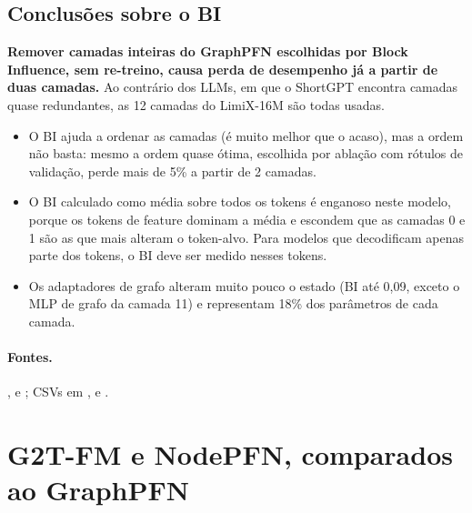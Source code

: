 \documentclass[12pt,a4paper]{article}
\begin{document}
\subsection{Conclusões sobre o BI}

\textbf{Remover camadas inteiras do GraphPFN escolhidas por Block Influence, sem re-treino, causa perda de desempenho já a partir de duas camadas.} Ao contrário dos LLMs, em que o ShortGPT encontra camadas quase redundantes, as 12 camadas do LimiX-16M são todas usadas.

\begin{itemize}
  \item O BI ajuda a ordenar as camadas (é muito melhor que o acaso), mas a ordem não basta: mesmo a ordem quase ótima, escolhida por ablação com rótulos de validação, perde mais de 5\% a partir de 2 camadas.
  \item O BI calculado como média sobre todos os tokens é enganoso neste modelo, porque os tokens de feature dominam a média e escondem que as camadas 0 e 1 são as que mais alteram o token-alvo. Para modelos que decodificam apenas parte dos tokens, o BI deve ser medido nesses tokens.
  \item Os adaptadores de grafo alteram muito pouco o estado (BI até 0,09, exceto o MLP de grafo da camada 11) e representam 18\% dos parâmetros de cada camada.
\end{itemize}

\paragraph{Fontes.}
{\raggedright {},  e ; CSVs em ,  e .\par}

\section{G2T-FM e NodePFN, comparados ao GraphPFN}
\label{sec:pfns}
\end{document}
